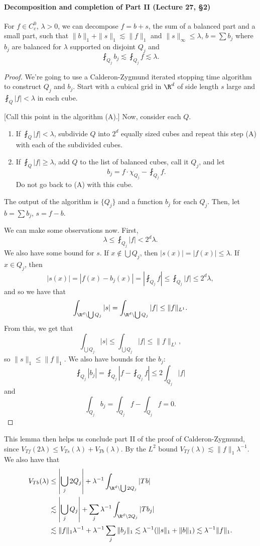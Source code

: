 \paragraph{Decomposition and completion of Part II (Lecture 27, \S2)}
\begin{lemma}
For $f\in C_c^0$, $\lambda>0$, we can decompose $f=b+s$, the sum of a balanced part and a small part, such that $\|b\|_1+\|s\|_1\lesssim\|f\|_1$ and $\|s\|_\infty\leq\lambda$, $b=\sum b_j$ where $b_j$ are balanced for $\lambda$ supported on disjoint $Q_j$ and
\[\fint_{Q_j}b_j\lesssim\fint_{Q_j}f\lesssim\lambda.\]
\end{lemma}
\begin{proof}
We're going to use a Calderon-Zygmund iterated stopping time algorithm to construct $Q_j$ and $b_j$. Start with a cubical grid in $\R^d$ of side length $s$ large and $\fint_Q|f|<\lambda$ in each cube.

[Call this point in the algorithm (A).] Now, consider each $Q$.
\begin{enumerate}[label=(\roman*)]
\item If $\fint_Q|f|<\lambda$, subdivide $Q$ into $2^d$ equally sized cubes and repeat this step (A) with each of the subdivided cubes.
\item If $\fint_Q|f|\geq\lambda$, add $Q$ to the list of balanced cubes, call it $Q_j$, and let
\[b_j=f\cdot\chi_{Q_j}-\fint_{Q_j}f.\]
Do not go back to (A) with this cube.
\end{enumerate}
The output of the algorithm is $\{Q_j\}$ and a function $b_j$ for each $Q_j$. Then, let $b=\sum b_j$, $s=f-b$.

We can make some observations now. First,
\[\lambda\leq\fint_{Q_j}|f|<2^d\lambda.\]
We also have some bound for $s$. If $x\notin\bigcup Q_j$, then $|s(x)|=|f(x)|\leq\lambda$. If $x\in Q_j$, then
\[|s(x)|=|f(x)-b_j(x)|=\left|\fint_{Q_j}f\right|\leq\fint_{Q_j}|f|\leq2^d\lambda,\]
and so we have that
\[\int_{\R^d\setminus\bigcup Q_j}|s|=\int_{\R^d\setminus\bigcup Q_j}|f|\leq\|f\|_{L^1}.\]
From this, we get that
\[\int_{\bigcup Q_j}|s|\leq\int_{\bigcup Q_j}|f|\leq\|f\|_{L^1},\]
so $\|s\|_1\leq\|f\|_1$. We also have bounds for the $b_j$:
\[\fint_{Q_j}|b_j|=\fint_{Q_j}\left|f-\fint_{Q_j}f\right|\leq2\int_{Q_j}|f|\]
and
\[\int_{Q_j}b_j=\int_{Q_j}f-\int_{Q_j}f=0.\]
\end{proof}
This lemma then helps us conclude part II of the proof of Calderon-Zygmund, since $V_{Tf}(2\lambda)\leq V_{Ts}(\lambda)+V_{Tb}(\lambda)$. By the $L^2$ bound $V_{Tf}(\lambda)\lesssim\|f\|_1\lambda^{-1}$. We also have that
\begin{align*}
V_{Tb}(\lambda)&\leq\left|\bigcup_j2Q_j\right|+\lambda^{-1}\int_{\R^d\setminus\bigcup2Q_j}|Tb|\\
&\lesssim\left|\bigcup_jQ_j\right|+\sum_j\lambda^{-1}\int_{\R^d\setminus2Q_j}|Tb_j|\\
&\lesssim\|f\|_1\lambda^{-1}+\lambda^{-1}\sum_j\|b_j\|_1
\lesssim\lambda^{-1}(\|s\|_1+\|b\|_1)\lesssim\lambda^{-1}\|f\|_1.
\end{align*}
